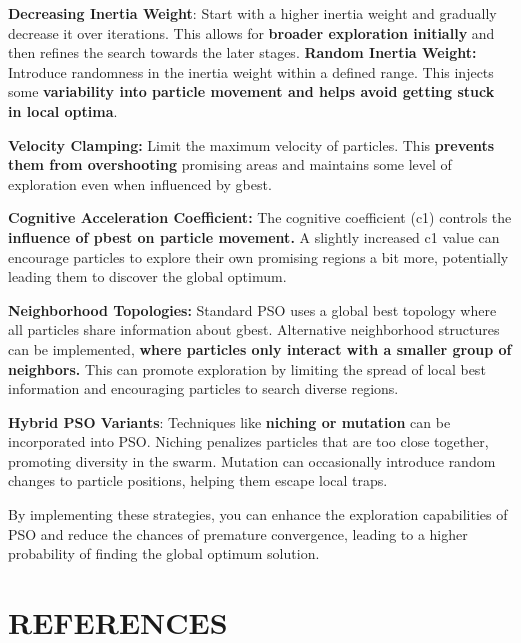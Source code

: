 \documentclass[12pt]{report}
\begin{document}
\textbf{Decreasing Inertia Weight}: Start with a higher inertia weight and gradually decrease it over iterations. This allows for\textbf{ broader exploration initially} and then refines the search towards the later stages.
\textbf{Random Inertia Weight:} Introduce randomness in the inertia weight within a defined range. This injects some\textbf{ variability into particle movement and helps avoid getting stuck in local optima}.

\textbf{Velocity Clamping:} Limit the maximum velocity of particles. This\textbf{ prevents them from overshooting }promising areas and maintains some level of exploration even when influenced by gbest.

\textbf{Cognitive Acceleration Coefficient:} The cognitive coefficient (c1) controls the \textbf{influence of pbest on particle movement.} A slightly increased c1 value can encourage particles to explore their own promising regions a bit more, potentially leading them to discover the global optimum.

\textbf{Neighborhood Topologies:} Standard PSO uses a global best topology where all particles share information about gbest. Alternative neighborhood structures can be implemented,\textbf{ where particles only interact with a smaller group of neighbors.} This can promote exploration by limiting the spread of local best information and encouraging particles to search diverse regions.

\textbf{Hybrid PSO Variants}: Techniques like\textbf{ niching or mutation} can be incorporated into PSO. Niching penalizes particles that are too close together, promoting diversity in the swarm. Mutation can occasionally introduce random changes to particle positions, helping them escape local traps.

By implementing these strategies, you can enhance the exploration capabilities of PSO and reduce the chances of premature convergence, leading to a higher probability of finding the global optimum solution.


\section*{REFERENCES}
\end{document}
